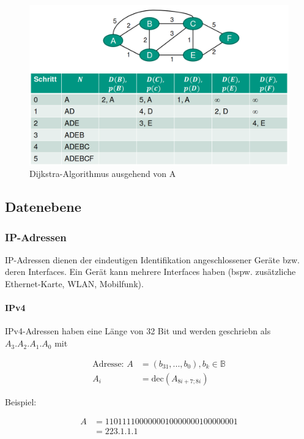 \documentclass[a4paper, 14pt]{article}
\begin{document}
	\begin{figure}
		\includegraphics[width=\textwidth]{images/05-link-state-dijkstra.png}
		\caption{Dijkstra-Algorithmus ausgehend von A}
	\end{figure}

	\subsection{Datenebene}

	\subsubsection{IP-Adressen}

	IP-Adressen dienen der eindeutigen Identifikation angeschlossener Geräte bzw. deren Interfaces.
	Ein Gerät kann mehrere Interfaces haben (bspw. zusätzliche Ethernet-Karte, WLAN, Mobilfunk).

	\paragraph{IPv4}

	IPv4-Adressen haben eine Länge von 32 Bit und werden geschriebn als $A_3 . A_2 . A_1 . A_0$ mit

	\begin{align*}
		\text{Adresse: } A &= (b_{31}, ..., b_0), b_k \in \mathbb{B} \\
		A_i &= \text{dec}(A_{8i + 7; 8i})
	\end{align*}

	Beispiel:

	\begin{align*}
		A &= 1101111 00000001 00000001 00000001 \\
		&= 223.1.1.1
	\end{align*}
\end{document}
